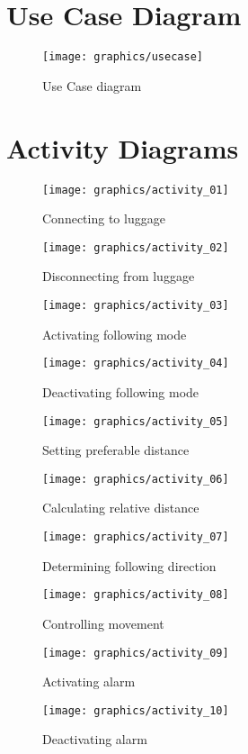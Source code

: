 \section{Use Case Diagram}
\begin{figure}[H]
\centering
\texttt{[image: graphics/usecase]}
\caption{Use Case diagram}
\label{fig:usecase}
\end{figure}
\pagebreak
\section{Activity Diagrams}
\begin{figure}[H]
\centering
\texttt{[image: graphics/activity\_01]}
\caption{Connecting to luggage}
\label{fig:activity_01}
\end{figure}
\begin{figure}[H]
\centering
\texttt{[image: graphics/activity\_02]}
\caption{Disconnecting from luggage}
\label{fig:activity_02}
\end{figure}
\pagebreak
\begin{figure}[H]
\centering
\texttt{[image: graphics/activity\_03]}
\caption{Activating following mode}
\label{fig:activity_03}
\end{figure}
\begin{figure}[H]
\centering
\texttt{[image: graphics/activity\_04]}
\caption{Deactivating following mode}
\label{fig:activity_04}
\end{figure}
\pagebreak
\begin{figure}[H]
\centering
\texttt{[image: graphics/activity\_05]}
\caption{Setting preferable distance}
\label{fig:activity_05}
\end{figure}
\begin{figure}[H]
\centering
\texttt{[image: graphics/activity\_06]}
\caption{Calculating relative distance}
\label{fig:activity_06}
\end{figure}
\begin{figure}[H]
\centering
\texttt{[image: graphics/activity\_07]}
\caption{Determining following direction}
\label{fig:activity_07}
\end{figure}
\begin{figure}[H]
\centering
\texttt{[image: graphics/activity\_08]}
\caption{Controlling movement}
\label{fig:activity_08}
\end{figure}
\begin{figure}[H]
\centering
\texttt{[image: graphics/activity\_09]}
\caption{Activating alarm}
\label{fig:activity_09}
\end{figure}
\begin{figure}[H]
\centering
\texttt{[image: graphics/activity\_10]}
\caption{Deactivating alarm}
\label{fig:activity_10}
\end{figure}